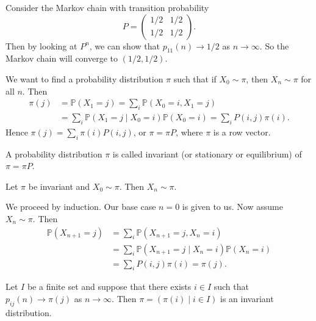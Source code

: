 \documentclass[12pt]{article}
\begin{document}
\begin{exbox}
	Consider the Markov chain with transition probability
	\[
	P =
	\begin{pmatrix}
		1/2 & 1/2 \\
		1/2 & 1/2
	\end{pmatrix}
	.\]
	Then by looking at $P^{n}$, we can show that $p_{11}(n) \to 1/2$ as $n \to \infty$. So the Markov chain will converge to $(1/2, 1/2)$.
\end{exbox}

We want to find a probability distribution $\pi$ such that if $X_0 \sim \pi$, then $X_n \sim \pi$ for all $n$. Then
\begin{align*}
	\pi(j) &= \mathbb{P}(X_1 = j) = \sum_{i} \mathbb{P}(X_0 = i, X_1 = j) \\
	       &= \sum_{i} \mathbb{P}(X_1 = j \mid X_0 = i)\mathbb{P}(X_0 = i) = \sum_{i}P(i, j) \pi(i).
\end{align*}
Hence $\pi(j) = \sum_{i} \pi(i) P(i, j)$, or $\pi = \pi P$, where $\pi$ is a row vector.

\begin{definition}
	A probability distribution $\pi$ is called invariant (or stationary or equilibrium) of $\pi = \pi P$.
\end{definition}

\begin{theorem}
	Let $\pi$ be invariant and $X_0 \sim \pi$. Then $X_n \sim \pi$.
\end{theorem}

\begin{proofbox} 
	We proceed by induction. Our base case $n = 0$ is given to us. Now assume $X_{n} \sim \pi$. Then
	\begin{align*}
		\mathbb{P}(X_{n+1} = j) &= \sum_{i} \mathbb{P}(X_{n+1} = j, X_n = i) \\
					&= \sum_{i}\mathbb{P}(X_{n+1} = j \mid X_n = i) \mathbb{P}(X_n = i) \\
					&= \sum_{i} P(i, j) \pi(i) = \pi(j).
	\end{align*}
\end{proofbox}

\begin{theorem}
	Let $I$ be a finite set and suppose that there exists $i \in I$ such that $p_{ij}(n) \to \pi(j)$ as $n \to \infty$. Then $\pi = (\pi(i) \mid i \in I)$ is an invariant distribution.
\end{theorem}
\end{document}
